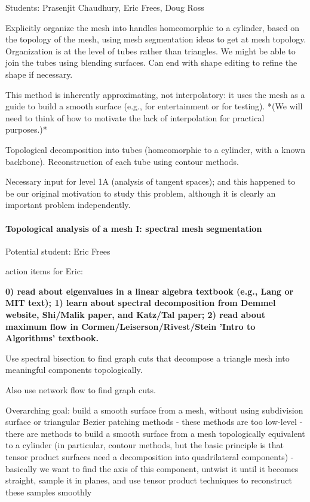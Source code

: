 \documentclass[11pt]{article}
\begin{document}
Students: Prasenjit Chaudhury, Eric Frees, Doug Ross

Explicitly organize the mesh into handles homeomorphic to a cylinder, based on the topology
of the mesh, using mesh segmentation ideas to get at mesh topology.
Organization is at the level of tubes rather than triangles.
We might be able to join the tubes using blending surfaces.
Can end with shape editing to refine the shape if necessary.

This method is inherently approximating, not interpolatory: it uses the mesh as a guide
to build a smooth surface (e.g., for entertainment or for testing).  
*(We will need to think of how to motivate the lack of interpolation for practical purposes.)*

Topological decomposition into tubes (homeomorphic to a cylinder, with a known backbone).
Reconstruction of each tube using contour methods.

Necessary input for level 1A (analysis of tangent spaces);
and this happened to be our original motivation to study this problem,
although it is clearly an important problem independently.


\paragraph{Topological analysis of a mesh I: spectral mesh segmentation}

Potential student: Eric Frees

action items for Eric:

{\bf 
0) read about eigenvalues in a linear algebra textbook (e.g., Lang or MIT text);
1) learn about spectral decomposition from Demmel website, Shi/Malik paper, and Katz/Tal paper;
2) read about maximum flow in Cormen/Leiserson/Rivest/Stein 'Intro to Algorithms' textbook.
}

Use spectral bisection to find graph cuts that decompose a triangle mesh into
meaningful components topologically.

Also use network flow to find graph cuts.

Overarching goal: build a smooth surface from a mesh, without using subdivision
surface or triangular Bezier patching methods
  - these methods are too low-level
  - there are methods to build a smooth surface from a mesh topologically
    equivalent to a cylinder (in particular, contour methods, but the basic
    principle is that tensor product surfaces need a decomposition into
    quadrilateral components)
  - basically we want to find the axis of this component, untwist it until
    it becomes straight, sample it in planes, and use tensor product techniques
    to reconstruct these samples smoothly
\end{document}
